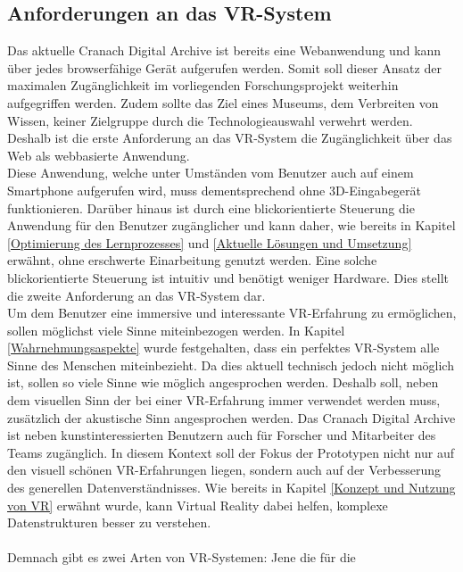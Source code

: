 \documentclass[a4paper,12pt,oneside]{article}
\begin{document}
    \subsection{Anforderungen an das VR-System}
      Das aktuelle Cranach Digital Archive ist bereits eine Webanwendung und kann 
      über jedes browserfähige Gerät aufgerufen werden. Somit soll dieser Ansatz 
      der maximalen Zugänglichkeit im vorliegenden Forschungsprojekt 
      weiterhin aufgegriffen werden.
      Zudem sollte das Ziel eines Museums, dem Verbreiten von Wissen, keiner Zielgruppe
      durch die Technologieauswahl verwehrt werden.
      Deshalb ist die erste Anforderung an das VR-System die Zugänglichkeit
      über das Web als webbasierte Anwendung. \\
      Diese Anwendung, welche unter Umständen vom Benutzer auch auf einem 
      Smartphone aufgerufen wird, muss dementsprechend ohne 
      3D-Eingabegerät funktionieren.
      Darüber hinaus ist durch eine blickorientierte Steuerung die Anwendung für
      den Benutzer zugänglicher und kann daher, wie bereits in
      Kapitel \ref{Optimierung des Lernprozesses}
      und \ref{Aktuelle Lösungen und Umsetzung} erwähnt, ohne erschwerte Einarbeitung
      genutzt werden. 
      Eine solche blickorientierte Steuerung ist intuitiv und benötigt weniger
      Hardware. Dies stellt die zweite Anforderung an das VR-System dar. \\
      Um dem Benutzer eine immersive und interessante VR-Erfahrung zu ermöglichen, sollen
      möglichst viele Sinne miteinbezogen werden. In Kapitel \ref{Wahrnehmungsaspekte}
      wurde festgehalten, dass ein perfektes VR-System alle Sinne des Menschen miteinbezieht.
      Da dies aktuell technisch jedoch nicht möglich ist, sollen so viele Sinne
      wie möglich angesprochen werden. Deshalb soll, neben dem
      visuellen Sinn der bei einer VR-Erfahrung immer
      verwendet werden muss, zusätzlich der akustische Sinn angesprochen werden.
      Das Cranach Digital Archive ist neben kunstinteressierten Benutzern auch für
      Forscher und Mitarbeiter des Teams zugänglich. In diesem Kontext soll der
      Fokus der Prototypen nicht nur auf den visuell schönen VR-Erfahrungen liegen,
      sondern auch auf der Verbesserung des generellen Datenverständnisses.
      Wie bereits in Kapitel \ref{Konzept und Nutzung von VR}
      erwähnt wurde, kann Virtual Reality dabei helfen, komplexe Datenstrukturen besser
      zu verstehen. \\ \\
      Demnach gibt es zwei Arten von VR-Systemen: Jene die für die 
\end{document}
